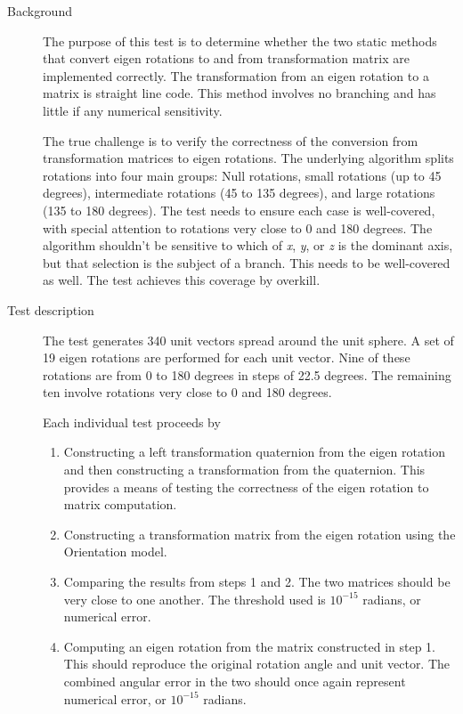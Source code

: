 \label{test:eigen}
\begin{description}
\item[Background]
The purpose of this test is to determine whether the two static
methods that convert eigen rotations to and from transformation matrix
are implemented correctly. The transformation from an eigen rotation to a matrix
is straight line code. This method involves no branching and has little if any numerical sensitivity.

The true challenge is to verify the correctness of the conversion from
transformation matrices to eigen rotations. The underlying algorithm splits
rotations into four main groups: Null rotations, small rotations (up to 45
degrees), intermediate rotations (45 to 135 degrees), and large rotations
(135 to 180 degrees). The test needs to ensure each case is well-covered, with
special attention to rotations very close to 0 and 180 degrees.
The algorithm shouldn't be sensitive to which of {\em x}, {\em y}, or {\em z} is
the dominant axis, but that selection is the subject of a branch. This needs to
be well-covered as well. The test achieves this coverage by overkill.

\item[Test description]
The test generates 340 unit vectors spread around the unit sphere. A set of 19
eigen rotations are performed for each unit vector. Nine of these rotations
are from 0 to 180 degrees in steps of 22.5 degrees. The remaining ten involve
rotations very close to 0 and 180 degrees.

Each individual test proceeds by
\begin{enumerate}
\item Constructing a left transformation quaternion from the eigen rotation and
then constructing a transformation from the quaternion. This provides a means
of testing the correctness of the eigen rotation to matrix computation.
\item Constructing a transformation matrix from the eigen rotation using
the Orientation model.
\item Comparing the results from steps 1 and 2. The two matrices should be
very close to one another. The threshold used is $10^{-15}$ radians, or
numerical error.
\item Computing an eigen rotation from the matrix constructed in step 1.
This should reproduce the original rotation angle and unit vector. The
combined angular error in the two should once again represent numerical
error, or $10^{-15}$ radians.
\end{enumerate}


\end{description}
